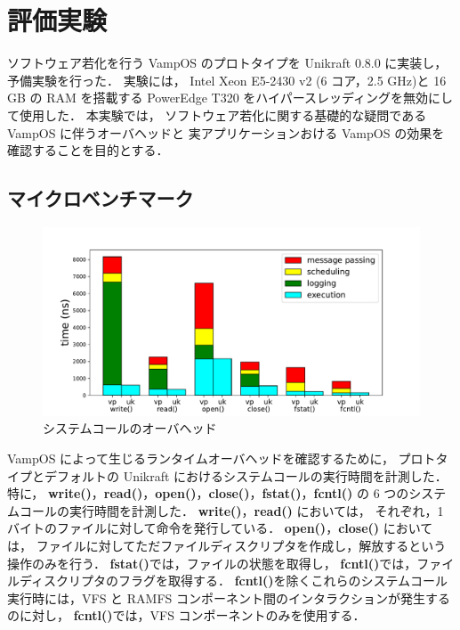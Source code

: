 \section{評価実験} \label{sec:evaluation}


ソフトウェア若化を行う VampOS のプロトタイプを Unikraft 0.8.0 に実装し，予備実験を行った．
実験には，
Intel Xeon E5-2430 v2 (6 コア，2.5 GHz)と 16 GB の RAM を搭載する
PowerEdge T320 をハイパースレッディングを無効にして使用した．
本実験では，
ソフトウェア若化に関する基礎的な疑問である
VampOS に伴うオーバヘッドと
実アプリケーションおける VampOS の効果を確認することを目的とする．

\subsection{マイクロベンチマーク}

\begin{figure}[!t]
    \centering
    \includegraphics[width=\linewidth]{img/syscall-time.pdf}
    \caption{システムコールのオーバヘッド}
    \label{fig:func-time}
\end{figure}

VampOS によって生じるランタイムオーバヘッドを確認するために，
プロトタイプとデフォルトの Unikraft におけるシステムコールの実行時間を計測した．
特に，
\textbf{write()}，\textbf{read()}，\textbf{open()}，\textbf{close()}，\textbf{fstat()}，\textbf{fcntl()} の 6 つのシステムコールの実行時間を計測した．
\textbf{write()}，\textbf{read()} においては，
それぞれ，1 バイトのファイルに対して命令を発行している．
\textbf{open()}，\textbf{close()} においては，
ファイルに対してただファイルディスクリプタを作成し，解放するという操作のみを行う．
\textbf{fstat()}では，ファイルの状態を取得し，
\textbf{fcntl()}では，ファイルディスクリプタのフラグを取得する．
\textbf{fcntl()}を除くこれらのシステムコール実行時には，VFS と RAMFS コンポーネント間のインタラクションが発生するのに対し，
\textbf{fcntl()}では，VFS コンポーネントのみを使用する．


